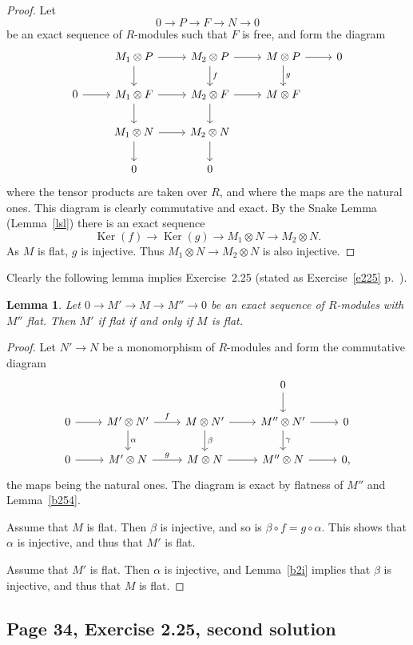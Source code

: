 \documentclass[parskip=half,fontsize=12pt]{scrartcl}%
\newcommand{\oo}{\operatorname}\newcommand{\ooo}{\operatorname*}
\newtheorem{lem}[thm]{Lemma}
\begin{document}
\begin{proof}
Let 
$$
0\to P\to F\to N\to 0
$$ 
be an exact sequence of $R$-modules such that $F$ is free, and form the diagram
$$
\begin{tikzcd}
&M_1\otimes P\ar[d]\ar[r]&M_2\otimes P\ar[d,"f"]\ar[r]&M\otimes P\ar[d,"g"]\ar[r]&0\\ 
0\ar[r]&M_1\otimes F\ar[d]\ar[r]&M_2\otimes F\ar[d]\ar[r]&M\otimes F\\ 
&M_1\otimes N\ar[d]\ar[r]&M_2\otimes N\ar[d]\\ 
&0&0
\end{tikzcd}
$$ 
where the tensor products are taken over $R$, and where the maps are the natural ones. This diagram is clearly commutative and exact. By the Snake Lemma (Lemma~\ref{lsl}) there is an exact sequence  
$$
\oo{Ker}(f)\to\oo{Ker}(g)\to M_1\otimes N\to M_2\otimes N.
$$ 
As $M$ is flat, $g$ is injective. Thus $M_1\otimes N\to M_2\otimes N$ is also injective. 
\end{proof}

Clearly the following lemma implies Exercise~2.25 (stated as Exercise~\ref{e225} p.~\pageref{e225}).

\begin{lem}
Let $0\to M'\to M\to M''\to0$ be an exact sequence of $R$-modules with $M''$ flat. Then $M'$ if flat if and only if $M$ is flat.
\end{lem}

\begin{proof}
Let $N'\to N$ be a monomorphism of $R$-modules and form the commutative diagram 
$$
\begin{tikzcd}
&&&0\ar[d]\\ 
0\ar[r]&M'\otimes N'\ar[d,"\alpha"]\ar[r,"f"]&M\otimes N'\ar[d,"\beta"]\ar[r]&M''\otimes N'\ar[d,"\gamma"]\ar[r]&0\\ 
0\ar[r]&M'\otimes N\ar[r,"g"]&M\otimes N\ar[r]&M''\otimes N\ar[r]&0,
\end{tikzcd}
$$ 
the maps being the natural ones. The diagram is exact by flatness of $M''$ and Lemma~\ref{b254}.

Assume that $M$ is flat. Then $\beta$ is injective, and so is $\beta\circ f=g\circ\alpha$. This shows that $\alpha$ is injective, and thus that $M'$ is flat.

Assume that $M'$ is flat. Then $\alpha$ is injective, and Lemma~\ref{b2i} implies that $\beta$ is injective, and thus that $M$ is flat.
\end{proof}

\subsection{Page 34, Exercise 2.25, second solution}\label{sol2}%
\end{document}
